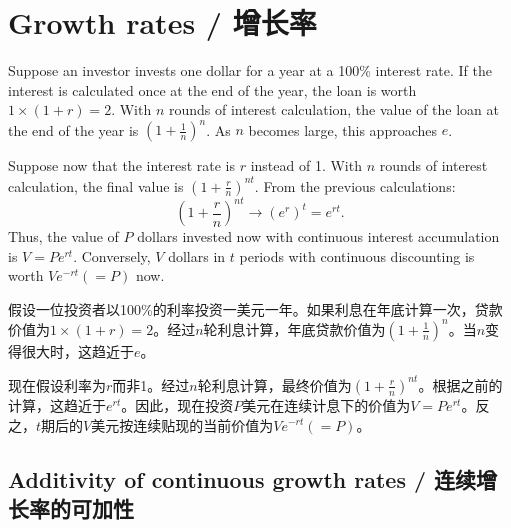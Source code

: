 \section{Growth rates / 增长率}

\begin{original}
Suppose an investor invests one dollar for a year at a 100\% interest rate. If the interest is calculated once at the end of the year, the loan is worth $1 \times (1+r) = 2$. With $n$ rounds of interest calculation, the value of the loan at the end of the year is $\left(1 + \frac{1}{n}\right)^n$. As $n$ becomes large, this approaches $e$.

Suppose now that the interest rate is $r$ instead of 1. With $n$ rounds of interest calculation, the final value is $\left(1 + \frac{r}{n}\right)^{nt}$. From the previous calculations:
\[
\left(1 + \frac{r}{n}\right)^{nt} \to (e^r)^t = e^{rt}.
\]
Thus, the value of $P$ dollars invested now with continuous interest accumulation is $V = P e^{rt}$. Conversely, $V$ dollars in $t$ periods with continuous discounting is worth $V e^{-rt} (= P)$ now.
\end{original}
\begin{translation}
假设一位投资者以100\%的利率投资一美元一年。如果利息在年底计算一次，贷款价值为$1 \times (1+r) = 2$。经过$n$轮利息计算，年底贷款价值为$\left(1 + \frac{1}{n}\right)^n$。当$n$变得很大时，这趋近于$e$。

现在假设利率为$r$而非1。经过$n$轮利息计算，最终价值为$\left(1 + \frac{r}{n}\right)^{nt}$。根据之前的计算，这趋近于$e^{rt}$。因此，现在投资$P$美元在连续计息下的价值为$V = P e^{rt}$。反之，$t$期后的$V$美元按连续贴现的当前价值为$V e^{-rt} (= P)$。
\end{translation}

\subsection{Additivity of continuous growth rates / 连续增长率的可加性}

